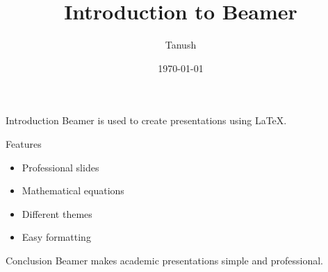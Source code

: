 \documentclass{beamer}
\title{Introduction to Beamer}
\author{Tanush}
\institute{NIT Jaipur}
\date{\today}
\begin{document}
\begin{frame}
    \titlepage
\end{frame}

\begin{frame}{Introduction}
    Beamer is used to create presentations
    using LaTeX.
\end{frame}

\begin{frame}{Features}
    \begin{itemize}
        \item Professional slides
        \item Mathematical equations
        \item Different themes
        \item Easy formatting
    \end{itemize}
\end{frame}

\begin{frame}{Conclusion}
    Beamer makes academic presentations
    simple and professional.
\end{frame}
\end{document}
